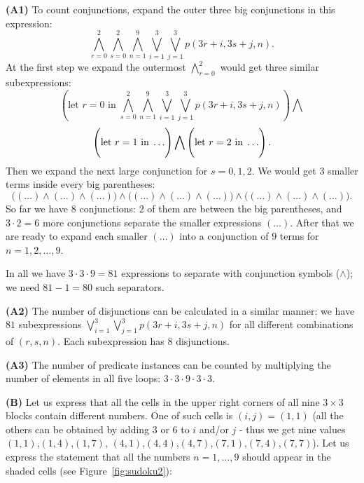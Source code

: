 \documentclass[jou]{apa6}
\begin{document}
\vspace{6pt}
{\bf (A1)} To count conjunctions, expand
the outer three big conjunctions in this expression:
$$\bigwedge\limits_{r = 0}^{2} \bigwedge\limits_{s = 0}^{2} \bigwedge\limits_{n = 1}^{9}
\bigvee\limits_{i = 1}^{3} \bigvee\limits_{j = 1}^{3} p(3r+i, 3s+j, n).$$
At the first step we expand the outermost $\bigwedge\limits_{r=0}^2$ 
would get three similar subexpressions:
$$\left( \mbox{let $r=0$ in}\; 
\bigwedge\limits_{s = 0}^{2} \bigwedge\limits_{n = 1}^{9}
\bigvee\limits_{i = 1}^{3} \bigvee\limits_{j = 1}^{3} p(3r+i, 3s+j, n) \right) \bigwedge$$
$$\left( \vphantom{\bigwedge\limits_{s = 0}^{2}} \mbox{let $r=1$ in}\; \ldots \right) \bigwedge 
\left( \vphantom{\bigwedge\limits_{s = 0}^{2}} \mbox{let $r=2$ in}\; \ldots \right).$$
Then we expand the next large conjunction for $s=0,1,2$. We would get $3$ smaller terms
inside every big parentheses:
{\small
$$\Big( (\ldots) \wedge (\ldots) \wedge (\ldots) \Big) \wedge
\Big( (\ldots) \wedge (\ldots) \wedge (\ldots) \Big) \wedge
\Big( (\ldots) \wedge (\ldots) \wedge (\ldots) \Big).$$
}
So far we have $8$ conjunctions: $2$ of them are between the big parentheses, 
and $3 \cdot 2 = 6$ more conjunctions separate the smaller expressions $(\ldots)$. 
After that we are ready to expand each smaller $(\ldots)$ into a conjunction of $9$ terms
for $n=1,2,\ldots,9$. 

In all we have $3 \cdot 3 \cdot 9 = 81$ expressions to separate with conjunction 
symbols ($\wedge$); we need $81-1 = 80$ such separators. 

{\bf (A2)} The number of disjunctions can be calculated in a similar manner: we have $81$ subexpressions
$\bigvee\limits_{i = 1}^{3} \bigvee\limits_{j = 1}^{3} p(3r+i, 3s+j, n)$ for all different 
combinations of $(r,s,n)$. Each subexpression has $8$ disjunctions. 

{\bf (A3)} The number of predicate instances can be counted by multiplying the 
number of elements in all five loops: $3 \cdot 3 \cdot 9 \cdot 3 \cdot 3$. 

{\bf (B)} Let us express that all the cells in the upper right corners
of all nine $3 \times 3$ blocks contain different numbers. 
One of such cells is $(i,j) = (1,1)$ (all the others can be obtained by 
adding $3$ or $6$ to $i$ and/or $j$ - thus we get nine values
$(1,1)$,$(1,4)$,$(1,7)$,
$(4,1)$,$(4,4)$,$(4,7)$,$(7,1)$,$(7,4)$,$(7,7)$). Let us express the 
statement that all the numbers $n=1,\ldots,9$ 
should appear in the shaded cells (see Figure~\ref{fig:sudoku2}):
\end{document}
